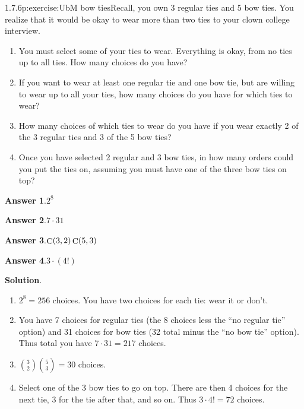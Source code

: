 \documentclass[twoside,11pt,]{book}
\newcommand{\blocktitlefont}{\relax}
\numberwithin{equation}{chapter}
\begin{document}
\begin{divisionsolution}{1.7.6}{}{p:exercise:UbM}%
bow tiesRecall, you own 3 regular ties and 5 bow ties. You realize that it would be okay to wear more than two ties to your clown college interview.%
\begin{enumerate}[label=(\alph*)]
\item{}You must select some of your ties to wear. Everything is okay, from no ties up to all ties. How many choices do you have?%
\item{}If you want to wear at least one regular tie and one bow tie, but are willing to wear up to all your ties, how many choices do you have for which ties to wear?%
\item{}How many choices of which ties to wear do you have if you wear exactly 2 of the 3 regular ties and 3 of the 5 bow ties?%
\item{}Once you have selected 2 regular and 3 bow ties, in how many orders could you put the ties on, assuming you must have one of the three bow ties on top?%
\end{enumerate}
%
\par\smallskip%
\noindent\textbf{\blocktitlefont Answer 1}.\quad{}\(2^{8}\)%
\par\smallskip%
\noindent\textbf{\blocktitlefont Answer 2}.\quad{}\(7\cdot 31\)%
\par\smallskip%
\noindent\textbf{\blocktitlefont Answer 3}.\quad{}\(\mathop{\rm C}\nolimits\!\left(3,2\right)\mathop{\rm C}\nolimits\!\left(5,3\right)\)%
\par\smallskip%
\noindent\textbf{\blocktitlefont Answer 4}.\quad{}\(3\cdot \left(4!\right)\)%
\par\smallskip%
\noindent\textbf{\blocktitlefont Solution}.\quad{}%
\begin{enumerate}[label=(\alph*)]
\item{}\(2^8 = 256\) choices. You have two choices for each tie: wear it or don't.%
\item{}You have 7 choices for regular ties (the 8 choices less the ``no regular tie'' option) and 31 choices for bow ties (32 total minus the ``no bow tie'' option). Thus total you have \(7 \cdot 31 = 217\) choices.%
\item{}\({3\choose 2}{5\choose 3} = 30\) choices.%
\item{}Select one of the 3 bow ties to go on top. There are then 4 choices for the next tie, 3 for the tie after that, and so on. Thus \(3\cdot 4! = 72\) choices.%
\end{enumerate}
%
\end{divisionsolution}%
\end{document}
